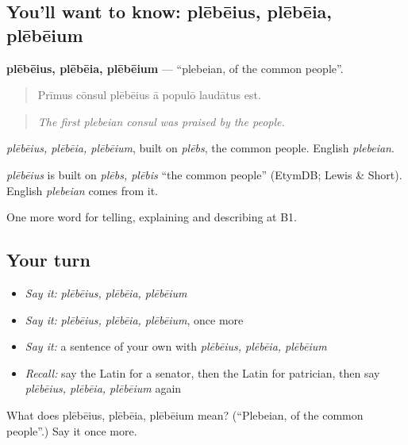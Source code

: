 \subsection*{You'll want to know: plēbēius, plēbēia, plēbēium}
\textbf{plēbēius, plēbēia, plēbēium} — \textquotedblleft{}plebeian, of the common people\textquotedblright{}.

\begin{quote}
Prīmus cōnsul plēbēius ā populō laudātus est.
\end{quote}

\begin{quote}
\emph{The first plebeian consul was praised by the people.}
\end{quote}

\emph{plēbēius, plēbēia, plēbēium}, built on \emph{plēbs}, the common people. English \emph{plebeian}.

\begin{cousinweb}
\emph{plēbēius} is built on \emph{plēbs, plēbis} \textquotedblleft{}the common people\textquotedblright{} (EtymDB; Lewis \& Short). English \emph{plebeian} comes from it.
\end{cousinweb}

\begin{grammarlens}[title={What you've built}]
One more word for telling, explaining and describing at B1.
\end{grammarlens}

\subsection*{Your turn}
\begin{itemize}
\raggedright
  \item \emph{Say it:} \emph{plēbēius, plēbēia, plēbēium}
  \item \emph{Say it:} \emph{plēbēius, plēbēia, plēbēium}, once more
  \item \emph{Say it:} a sentence of your own with \emph{plēbēius, plēbēia, plēbēium}
  \item \emph{Recall:} say the Latin for a senator, then the Latin for patrician, then say \emph{plēbēius, plēbēia, plēbēium} again
\end{itemize}

\begin{tcolorbox}[breakable,colback=teal!4,colframe=teal!35!black,title={Before you move on}]
What does plēbēius, plēbēia, plēbēium mean? (\textquotedblleft{}Plebeian, of the common people\textquotedblright{}.) Say it once more.
\end{tcolorbox}
